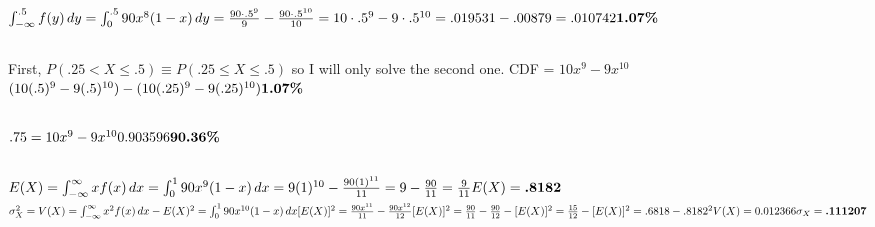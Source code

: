 \documentclass[12pt, letterpaper]{article}
\begin{document}
\begin{center}
\end{center}
\subsection{}
\(
\int_{-\infty}^{.5} f(y)\, dy \\
= \int_{0}^{.5} 90x^{8} (1 - x)\, dy \\
= \frac{90\cdot .5^{9}}{9} - \frac{90\cdot .5^{10}}{10} \\
= 10\cdot .5^{9} - 9\cdot .5^{10} \\
= .019531 - .00879 \\
= .010742 \\
\textbf{1.07\%}
\)
\subsection{}
First, $P(.25 < X \le .5) \equiv P(.25 \le X \le .5)$ so I will only solve the second one.
\newline
CDF = $10x^{9} - 9x^{10}$
\newline
\(
(10(.5)^{9} - 9(.5)^{10}) - (10(.25)^{9} - 9(.25)^{10}) \\
\textbf{1.07\%} \\
\)
\subsection{}
\(
.75 = 10x^{9} - 9x^{10} \\
0.903596 \\
\textbf{90.36\%}
\)
\subsection{}
\(
E(X) = \int_{-\infty}^{\infty} xf(x)\,dx \\
= \int_{0}^{1} 90x^{9}(1 - x)\, dx \\ 
= 9(1)^{10} - \frac{90(1)^{11}}{11} \\
= 9 - \frac{90}{11} \\
= \frac{9}{11} \\
E(X) = \textbf{.8182} \\
\)
\newline
\(
\sigma_{X}^{2} = V(X) = \int_{-\infty}^{\infty} x^{2}f(x)\,dx - E(X)^{2} \\
= \int_{0}^{1} 90x^{10}(1 - x)\, dx [E(X)]^{2}\\
= \frac{90x^{11}}{11} - \frac{90x^{12}}{12} [E(X)]^{2} \\
= \frac{90}{11} - \frac{90}{12} - [E(X)]^{2} \\
= \frac{15}{12} - [E(X)]^{2} \\
= .6818 - .8182^{2}\\
V(X) = 0.012366 \\
\sigma_{X} = \textbf{.111207} \\
\)
\end{document}
